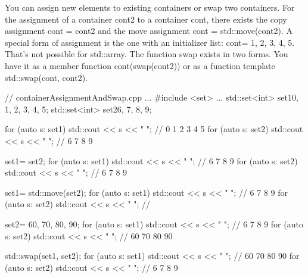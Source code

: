 You can assign new elements to existing containers or swap two containers. For the assignment of a container cont2 to a container cont, there exists the copy assignment cont = cont2 and the move assignment cont = std::move(cont2). A special form of assignment is the one with an initializer list: cont= {1, 2, 3, 4, 5}. That’s not possible for std::array. The function swap exists in two forms. You have it as a member function cont(swap(cont2)) or as a function template std::swap(cont, cont2).


\begin{cpp}
// containerAssignmentAndSwap.cpp
...
#include <set>
...
std::set<int> set1{0, 1, 2, 3, 4, 5};
std::set<int> set2{6, 7, 8, 9};

for (auto s: set1) std::cout << s << " "; // 0 1 2 3 4 5
for (auto s: set2) std::cout << s << " "; // 6 7 8 9

set1= set2;
for (auto s: set1) std::cout << s << " "; // 6 7 8 9
for (auto s: set2) std::cout << s << " "; // 6 7 8 9

set1= std::move(set2);
for (auto s: set1) std::cout << s << " "; // 6 7 8 9
for (auto s: set2) std::cout << s << " "; //

set2= {60, 70, 80, 90};
for (auto s: set1) std::cout << s << " "; // 6 7 8 9
for (auto s: set2) std::cout << s << " "; // 60 70 80 90

std::swap(set1, set2);
for (auto s: set1) std::cout << s << " "; // 60 70 80 90
for (auto s: set2) std::cout << s << " "; // 6 7 8 9
\end{cpp}